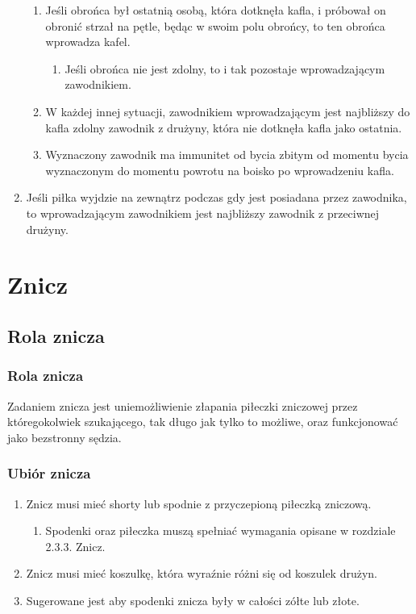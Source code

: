 \documentclass[11pt,a4paper]{article}
\begin{document}
\begin{enumerate}
  \begin{enumerate}
    \item Jeśli obrońca był ostatnią osobą, która dotknęła kafla, i próbował on obronić strzał na pętle, będąc w swoim polu obrońcy, to ten obrońca wprowadza kafel.
    \begin{enumerate}
      \item Jeśli obrońca nie jest zdolny, to i tak pozostaje wprowadzającym zawodnikiem.
    \end{enumerate}
    \item W każdej innej sytuacji, zawodnikiem wprowadzającym jest najbliższy do kafla zdolny zawodnik z drużyny, która nie dotknęła kafla jako ostatnia.
    \item Wyznaczony zawodnik ma immunitet od bycia zbitym od momentu bycia wyznaczonym do momentu powrotu na boisko po wprowadzeniu kafla.
  \end{enumerate}
  \item Jeśli piłka wyjdzie na zewnątrz podczas gdy jest posiadana przez zawodnika, to wprowadzającym zawodnikiem jest najbliższy zawodnik z przeciwnej drużyny.
\end{enumerate}

\section{Znicz}

\subsection{Rola znicza}

\subsubsection{Rola znicza}
Zadaniem znicza jest uniemożliwienie złapania piłeczki zniczowej przez któregokolwiek szukającego, tak długo jak tylko to możliwe, oraz funkcjonować jako bezstronny sędzia.

\subsubsection{Ubiór znicza}
\begin{enumerate}
  \item Znicz musi mieć shorty lub spodnie z przyczepioną piłeczką zniczową.
  \begin{enumerate}
    \item Spodenki oraz piłeczka muszą spełniać wymagania opisane w rozdziale 2.3.3. Znicz. %
  \end{enumerate}
  \item Znicz musi mieć koszulkę, która wyraźnie różni się od koszulek drużyn.
  \item Sugerowane jest aby spodenki znicza były w całości zółte lub złote.
\end{enumerate}
\end{document}
